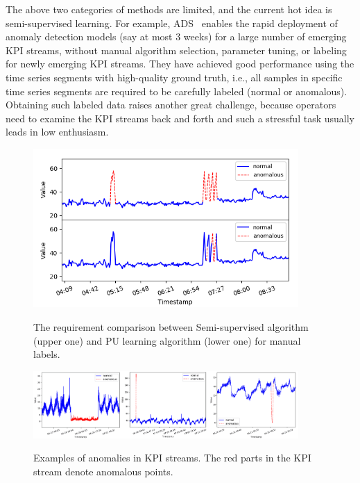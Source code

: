 The above two categories of methods are limited, and the current hot idea is semi-supervised learning. For example, ADS~\cite{ADSarticle} enables the rapid deployment of anomaly detection models (say at most 3 weeks) for a large number of emerging KPI streams, without manual algorithm selection, parameter tuning, or labeling for newly emerging KPI streams. %
They have achieved good performance using the time series segments with high-quality ground truth, i.e., all samples in specific time series segments are required to be carefully labeled (normal or anomalous). Obtaining such labeled data raises another great challenge, because operators need to examine the %
KPI streams back and forth and such a stressful task usually leads in low enthusiasm. 

\begin{figure}
  \begin{minipage}[h]{1.0\linewidth}
  \centering
  \setlength{\abovecaptionskip}{3.cm}
  \includegraphics[width=0.9\textwidth]{ADS_Journal/PU figures/Figure_1.png}\\
  \end{minipage}
  \caption{The requirement comparison between Semi-supervised algorithm (upper one) and PU learning algorithm (lower one) for manual labels.}
  \label{fig:comparison_labels}
\end{figure}

\begin{figure}
  \centering
  \includegraphics[width=0.9\textwidth]{ADS_Journal/PU figures/fake kpi.png}\\
  \caption{Examples of anomalies in KPI streams. The red parts in the KPI stream denote anomalous points.}
  \label{fig:KPI_anomaly}
\end{figure}

